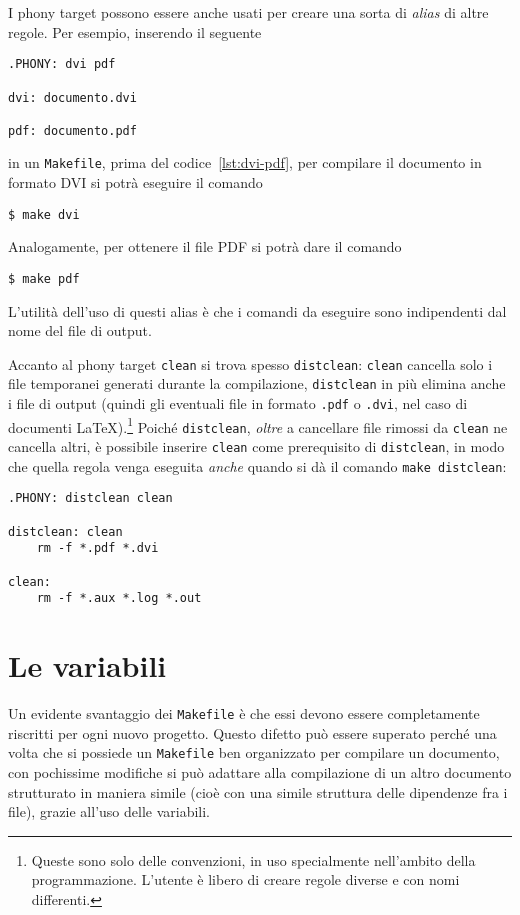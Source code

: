 I phony target possono essere anche usati per creare una sorta di \emph{alias}
di altre regole.  Per esempio, inserendo il seguente
\begin{lstlisting}[caption={I prerequisiti della regola dell'obiettivo
\texttt{.PHONY} sono i nomi dei phony target che vengono successivamente
specificati.},label=lst:phony]
.PHONY: dvi pdf

dvi: documento.dvi

pdf: documento.pdf
\end{lstlisting}
in un \texttt{Makefile}, prima del codice~\ref{lst:dvi-pdf}, per compilare il
documento in formato \textsc{DVI} si potrà eseguire il comando
\begin{verbatim}
$ make dvi
\end{verbatim} %
Analogamente, per ottenere il file \textsc{PDF} si potrà dare il comando
\begin{verbatim}
$ make pdf
\end{verbatim} %
L'utilità dell'uso di questi alias è che i comandi da eseguire sono indipendenti
dal nome del file di output.

Accanto al phony target \texttt{clean} si trova spesso \texttt{distclean}:
\texttt{clean} cancella solo i file temporanei generati durante la compilazione,
\texttt{distclean} in più elimina anche i file di output (quindi gli eventuali
file in formato \texttt{.pdf} o \texttt{.dvi}, nel caso di documenti
\LaTeX).\footnote{Queste sono solo delle convenzioni, in uso specialmente
  nell'ambito della programmazione.  L'utente è libero di creare regole diverse
  e con nomi differenti.}
Poiché \texttt{distclean}, \emph{oltre} a cancellare file rimossi da
\texttt{clean} ne cancella altri, è possibile inserire \texttt{clean} come
prerequisito di \texttt{distclean}, in modo che quella regola venga eseguita
\emph{anche} quando si dà il comando \texttt{make distclean}:
\begin{lstlisting}[caption={Phony target \texttt{distclean} e \texttt{clean}.},
label=lst:distclean]
.PHONY: distclean clean

distclean: clean
	rm -f *.pdf *.dvi

clean:
	rm -f *.aux *.log *.out
\end{lstlisting}


\section{Le variabili}
\label{sec:variabili}

Un evidente svantaggio dei \texttt{Makefile} è che essi devono essere
completamente riscritti per ogni nuovo progetto.  Questo difetto può essere
superato perché una volta che si possiede un \texttt{Makefile} ben organizzato
per compilare un documento, con pochissime modifiche si può adattare alla
compilazione di un altro documento strutturato in maniera simile (cioè con una
simile struttura delle dipendenze fra i file), grazie all'uso delle variabili.

